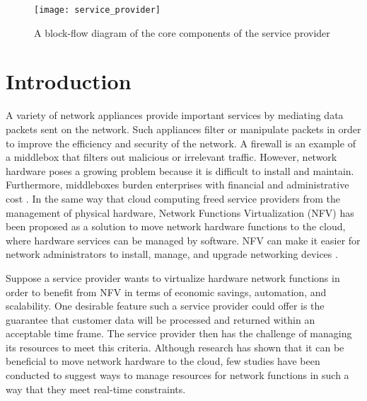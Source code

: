 \documentclass{sig-alternate}
\begin{document}
\begin{figure}[htb!]
 \begin{center}
   \texttt{[image: service\_provider]}
 \end{center}
 \vspace{-12pt}
 \caption{A block-flow diagram of the core components of the service provider}
 \label{fig:some_graph}
\end{figure}

\section{Introduction}
\label{sec:intro}
A variety of network appliances provide important services by mediating data packets sent on the network. Such appliances filter or manipulate packets in order to improve the efficiency and security of the network. A firewall is an example of a middlebox that filters out malicious or irrelevant traffic. However, network hardware poses a growing problem because it is difficult to install and maintain. Furthermore, middleboxes burden enterprises with financial and administrative cost \cite{white_paper}. In the same way that cloud computing freed service providers from the management of physical hardware, Network Functions Virtualization (NFV) has been proposed as a solution to move network hardware functions to the cloud, where hardware services can be managed by software. NFV can make it easier for network administrators to install, manage, and upgrade networking devices \cite{white_paper}.

Suppose a service provider wants to virtualize hardware network functions in order to benefit from NFV in terms of economic savings, automation, and scalability. One desirable feature such a service provider could offer is the guarantee that customer data will be processed and returned within an acceptable time frame. The service provider then has the challenge of managing its resources to meet this criteria. Although research has shown that it can be beneficial to move network hardware to the cloud, few studies have been conducted to suggest ways to manage resources for network functions in such a way that they meet real-time constraints.
\end{document}
